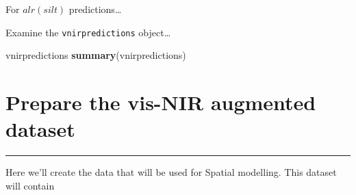 \documentclass[]{book}
\newenvironment{Shaded}{\begin{snugshade}}{\end{snugshade}}
\newcommand{\CommentTok}[1]{\textcolor[rgb]{0.56,0.35,0.01}{\textit{#1}}}
\newcommand{\DataTypeTok}[1]{\textcolor[rgb]{0.13,0.29,0.53}{#1}}
\newcommand{\DecValTok}[1]{\textcolor[rgb]{0.00,0.00,0.81}{#1}}
\newcommand{\KeywordTok}[1]{\textcolor[rgb]{0.13,0.29,0.53}{\textbf{#1}}}
\newcommand{\NormalTok}[1]{#1}
\newcommand{\OperatorTok}[1]{\textcolor[rgb]{0.81,0.36,0.00}{\textbf{#1}}}
\newcommand{\StringTok}[1]{\textcolor[rgb]{0.31,0.60,0.02}{#1}}
\begin{document}
For \(alr(silt)\) predictions\ldots{}

\begin{Shaded}
\end{Shaded}

Examine the \texttt{vnirpredictions} object\ldots{}

\begin{Shaded}
\begin{Highlighting}[]
\NormalTok{vnirpredictions}
\KeywordTok{summary}\NormalTok{(vnirpredictions)}
\end{Highlighting}
\end{Shaded}

\hypertarget{prepare-the-vis-nir-augmented-dataset}{%
\chapter{Prepare the vis-NIR augmented dataset}\label{prepare-the-vis-nir-augmented-dataset}}

\begin{center}\rule{0.5\linewidth}{\linethickness}\end{center}

Here we'll create the data that will be used for Spatial modelling. This dataset will contain
\end{document}
